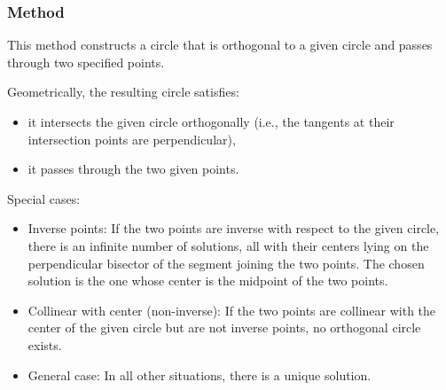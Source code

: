 \subsubsection{Method }
\label{ssub:method_circle_orthogonal_through}

This method constructs a circle that is orthogonal to a given circle and passes through two specified points.

\medskip
\noindent
Geometrically, the resulting circle satisfies:
\begin{itemize}
\item it intersects the given circle orthogonally (i.e., the tangents at their intersection points are perpendicular),
\item it passes through the two given points.
\end{itemize}

\medskip
\noindent
Special cases:
\begin{itemize}
\item Inverse points:
If the two points are inverse with respect to the given circle, there is an infinite number of solutions, all with their centers lying on the perpendicular bisector of the segment joining the two points.
The chosen solution is the one whose center is the midpoint of the two points.

\item Collinear with center (non-inverse):
If the two points are collinear with the center of the given circle but are not inverse points, no orthogonal circle exists.

\item General case:
In all other situations, there is a unique solution.
\end{itemize}

\vspace{1em}
\begin{minipage}{.5\textwidth}
\begin{center}
\end{center}
\end{minipage}
\begin{minipage}{.5\textwidth}
\begin{tkzexample}
\end{tkzexample}
\end{minipage}

